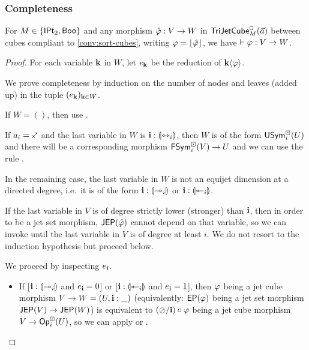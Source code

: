 \documentclass[a4paper]{memoir}
\begin{document}
\subsubsection{Completeness}
\begin{theorem}[Completeness] \label{thm:calculus-complete}
	For $M \in \mathopen{}\left\{ {\mathsf{IPt}_2}, \mathsf{Boo} \right\}\mathclose{}$ and any morphism $\hat {\varphi} : V \to W$ in $\mathsf{TriJetCube}^{\Box}_{M}\mathopen{}\left( \vec a \right)\mathclose{}$ between cubes compliant to \cref{conv:sort-cubes}, writing $\varphi = \mathopen{}\left\lfloor \hat {\varphi} \right\rfloor\mathclose{}$, we have $\vdash \varphi : V \to W$.
\end{theorem}
\begin{proof}
	For each variable $\mathbf{k}$ in $W$, let $e_{\mathbf{k}}$ be the reduction of $\mathbf{k} \langle \varphi \rangle$.

	We prove completeness by induction on the number of nodes and leaves (added up) in the tuple $(e_{\mathbf{k}})_{\mathbf{k} \in W}$.
	
	If $W = ()$, then use .
	
	If $a_i = \ypolar$ and the last variable in $W$ is $\mathbf{i} : {\llparenthesis \leftrightarrowtriangle_i \rrparenthesis}$, then $W$ is of the form $\mathsf{USym}^\boxdot_i(U)$ and there will be a corresponding morphism $\mathsf{FSym}^\boxdot_i(V) \to U$ and we can use the rule .
	
	In the remaining case, the last variable in $W$ is not an equijet dimension at a directed degree, i.e.\ it is of the form $\mathbf{i} : {\llparenthesis \rightarrowtriangle_i \rrparenthesis}$ or $\mathbf{i} : {\llparenthesis \leftarrowtriangle_i \rrparenthesis}$.
	
	If the last variable in $V$ is of degree strictly lower (stronger) than $\mathbf{i}$, then in order to be a jet set morphism, $\mathsf{JEP}(\hat {\varphi})$ cannot depend on that variable, so we can invoke  until the last variable in $V$ is of degree at least $i$. We do not resort to the induction hypothesis but proceed below.
	
	
	We proceed by inspecting $e_{\mathbf{i}}$.
	
	\begin{itemize}
		\item If [$\mathbf{i} : {\llparenthesis \rightarrowtriangle_i \rrparenthesis}$ and $e_{\mathbf{i}} = 0$] or [$\mathbf{i} : {\llparenthesis \leftarrowtriangle_i \rrparenthesis}$ and $e_{\mathbf{i}} = 1$], then $\varphi$ being a jet cube morphism $V \to W = (U, \mathbf{i} : \_)$ (equivalently: $\mathsf{EP}(\varphi)$ being a jet set morphism $\mathsf{JEP}(V) \to \mathsf{JEP}(W)$) is equivalent to $(\oslash / \mathbf{i}) \circ \varphi$ being a jet cube morphism $V \to {\mathsf{Op}}^\boxdot_i(U)$, so we can apply  or .
		

\end{itemize}
\end{proof}
\end{document}
